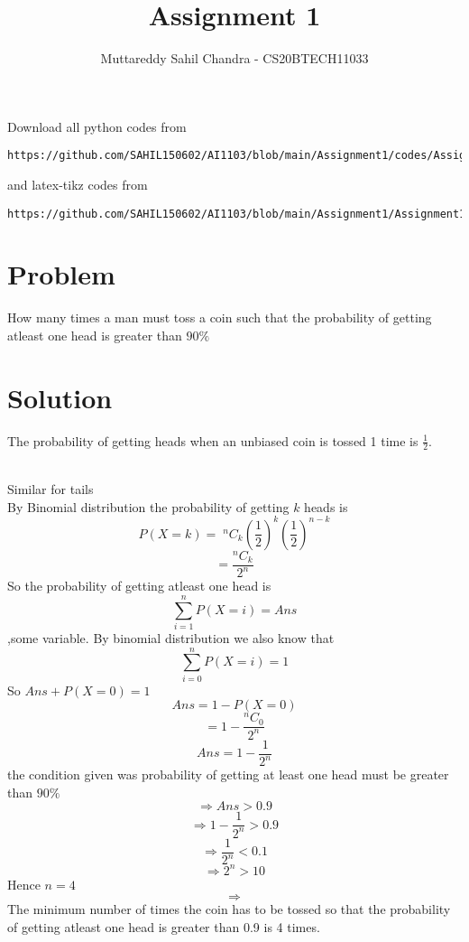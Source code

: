 \documentclass[journal,12pt,twocolumn]{IEEEtran}
\begin{document}
\title{Assignment 1}
\author{Muttareddy Sahil Chandra - CS20BTECH11033}
\maketitle
\newpage
\bigskip
\renewcommand{\thefigure}{\theenumi}
\renewcommand{\thetable}{\theenumi}
Download all python codes from 
\begin{lstlisting}
https://github.com/SAHIL150602/AI1103/blob/main/Assignment1/codes/Assignment.py
\end{lstlisting}
%
and latex-tikz codes from 
%
\begin{lstlisting}
https://github.com/SAHIL150602/AI1103/blob/main/Assignment1/Assignment1.tex
\end{lstlisting}
\section{Problem}
How many times a man must toss a coin such that the probability of getting atleast one head is greater than $90\%$
\section{Solution} 
The probability of getting heads when an unbiased coin is tossed 1 time  is {\large$\frac{1}{2}$}.

  \\ Similar for tails
  \\By Binomial distribution the probability of getting $k$ heads is
  $$P(X = k) =\;  ^nC_k \left(\frac{1}{2}\right)^k \left(\frac{1}{2}\right)^{n-k}$$
  $$=\frac{^nC_k}{2^n}$$
  So the probability of getting atleast one head is \[\sum_{i=1}^{n}P(X=i)=Ans\] ,some variable.
  By binomial distribution we also know that 
  \[\sum_{i=0}^{n}P(X=i)=1\]
  So    \;\;\;\;\;\;\;\;\;\;\;\;\;    $Ans + P(X=0)=1$
  $$Ans = 1-P(X=0)$$
  $$= 1-\frac{^nC_0}{2^n}$$
  $$Ans =1- \frac{1}{2^n}$$
  the condition given was probability of getting at least one head must be greater than  $90\%$
  $$\Rightarrow Ans>0.9$$
  $$\Rightarrow 1-\frac{1}{2^n}>0.9$$
  $$\Rightarrow\frac{1}{2^n}<0.1$$
  $$\Rightarrow 2^n>10$$
  Hence $n =4$
$$\Rightarrow$$ The minimum number of times the coin has to be tossed so that the probability  of getting atleast one head is greater than 0.9 is 4 times.    
\end{document}
